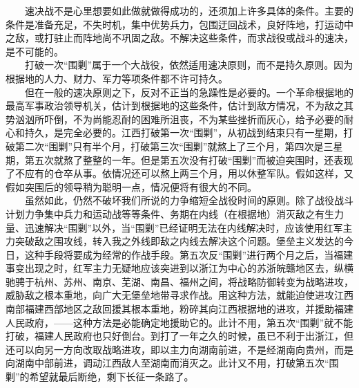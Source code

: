 \documentclass[cn,11pt,chinese]{elegantbook}
\begin{document}
　　速决战不是心里想要如此做就做得成功的，还须加上许多具体的条件。主要的条件是准备充足，不失时机，集中优势兵力，包围迂回战术，良好阵地，打运动中之敌，或打驻止而阵地尚不巩固之敌。不解决这些条件，而求战役或战斗的速决，是不可能的。\\
　　打破一次“围剿”属于一个大战役，依然适用速决原则，而不是持久原则。因为根据地的人力、财力、军力等项条件都不许可持久。\\
　　但在一般的速决原则之下，反对不正当的急躁性是必要的。一个革命根据地的最高军事政治领导机关，估计到根据地的这些条件，估计到敌方情况，不为敌之其势汹汹所吓倒，不为尚能忍耐的困难所沮丧，不为某些挫折而灰心，给予必要的耐心和持久，是完全必要的。江西打破第一次“围剿”，从初战到结束只有一星期，打破第二次“围剿”只有半个月，打破第三次“围剿”就熬上了三个月，第四次是三星期，第五次就熬了整整的一年。但是第五次没有打破“围剿”而被迫突围时，还表现了不应有的仓卒从事。依情况还可以熬上两三个月，用以休整军队。假如这样，又假如突围后的领导稍为聪明一点，情况便将有很大的不同。\\
　　虽然如此，仍然不破坏我们所说的力争缩短全战役时间的原则。除了战役战斗计划力争集中兵力和运动战等等条件、务期在内线（在根据地）消灭敌之有生力量、迅速解决“围剿”以外，当“围剿”已经证明无法在内线解决时，应该使用红军主力突破敌之围攻线，转入我之外线即敌之内线去解决这个问题。堡垒主义发达的今日，这种手段将要成为经常的作战手段。第五次反“围剿”进行两个月之后，当福建事变出现之时，红军主力无疑地应该突进到以浙江为中心的苏浙皖赣地区去，纵横驰骋于杭州、苏州、南京、芜湖、南昌、福州之间，将战略防御转变为战略进攻，威胁敌之根本重地，向广大无堡垒地带寻求作战。用这种方法，就能迫使进攻江西南部福建西部地区之敌回援其根本重地，粉碎其向江西根据地的进攻，并援助福建人民政府，——这种方法是必能确定地援助它的。此计不用，第五次“围剿”就不能打破，福建人民政府也只好倒台。到打了一年之久的时候，虽已不利于出浙江，但还可以向另一方向改取战略进攻，即以主力向湖南前进，不是经湖南向贵州，而是向湖南中部前进，调动江西敌人至湖南而消灭之。此计又不用，打破第五次“围剿”的希望就最后断绝，剩下长征一条路了。\\
\end{document}
